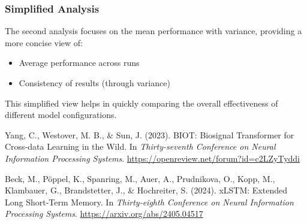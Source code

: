 \subsubsection{Simplified Analysis}
The second analysis focuses on the mean performance with variance, providing a more concise view of:
\begin{itemize}
    \item Average performance across runs
    \item Consistency of results (through variance)
\end{itemize}
This simplified view helps in quickly comparing the overall effectiveness of different model configurations.


\begin{thebibliography}{2}

Yang, C., Westover, M. B., \& Sun, J. (2023).
\newblock BIOT: Biosignal Transformer for Cross-data Learning in the Wild.
\newblock In {\em Thirty-seventh Conference on Neural Information Processing Systems}.
\newblock \url{https://openreview.net/forum?id=c2LZyTyddi}

Beck, M., Pöppel, K., Spanring, M., Auer, A., Prudnikova, O., Kopp, M., Klambauer, G., Brandstetter, J., \& Hochreiter, S. (2024).
\newblock xLSTM: Extended Long Short-Term Memory.
\newblock In {\em Thirty-eighth Conference on Neural Information Processing Systems}.
\newblock \url{https://arxiv.org/abs/2405.04517}

\end{thebibliography} 